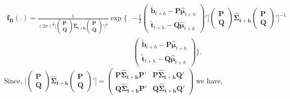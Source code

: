 \documentclass[a4paper, 11pt]{article}
\begin{document}
\begin{align*}
\bm{f_B}(.)=\frac{1}{(2\pi)^{\frac{n}{2}}\Big|\begin{pmatrix}\bm{P}\\\bm{Q}\end{pmatrix}\bm{\hat{\Sigma}_{t+h}}\begin{pmatrix}\bm{P}\\\bm{Q}\end{pmatrix}'\Big|^{\frac{1}{2}}}
\exp \Big\{&-\frac{1}{2} \begin{pmatrix}\tilde{\bm{b}}_{t+h} - \bm{P}\bm{\hat{\mu}}_{t+h}\\ \tilde{\bm{t}}_{t+h}- \bm{Q}\bm{\hat{\mu}}_{t+h}\end{pmatrix}' \Big[\begin{pmatrix}\bm{P}\\\bm{Q}\end{pmatrix}\bm{\hat{\Sigma}_{t+h}}\begin{pmatrix}\bm{P}\\\bm{Q}\end{pmatrix}'\Big]^{-1}\\
& \begin{pmatrix}\tilde{\bm{b}}_{t+h} - \bm{P}\bm{\hat{\mu}}_{t+h}\\ \tilde{\bm{t}}_{t+h}- \bm{Q}\bm{\hat{\mu}}_{t+h}\end{pmatrix} \Big\}.
\end{align*}
Since, $\Big[\begin{pmatrix}\bm{P}\\\bm{Q}\end{pmatrix}\bm{\hat{\Sigma}_{t+h}}\begin{pmatrix}\bm{P}\\\bm{Q}\end{pmatrix}'\Big] = \begin{pmatrix}
\bm{P}\bm{\hat{\Sigma}_{t+h}}\bm{P}' & \bm{P}\bm{\hat{\Sigma}_{t+h}}\bm{Q}' \\
\bm{Q}\bm{\hat{\Sigma}_{t+h}}\bm{P}' & \bm{Q}\bm{\hat{\Sigma}_{t+h}}\bm{Q}'
\end{pmatrix}$ we have,
\end{document}
